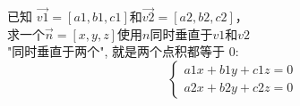 \documentclass[12pt]{article}
\begin{document}
\begin{flushleft}
    已知 $\vec{v1} = [a1, b1, c1] 和 \vec{v2} = [a2, b2, c2]$，\\
    求一个$\vec{n} = [x, y, z] 使用n 同时垂直于v1和v2$ \\
    
    "同时垂直于两个", 就是两个点积都等于 0: \\ 
    $$
    \left\{ 
    \begin{aligned}
        a1x + b1y + c1z = 0 \\ 
        a2x + b2y + c2z = 0
    \end{aligned} 
    \right.$$

\end{flushleft}
\end{document}
